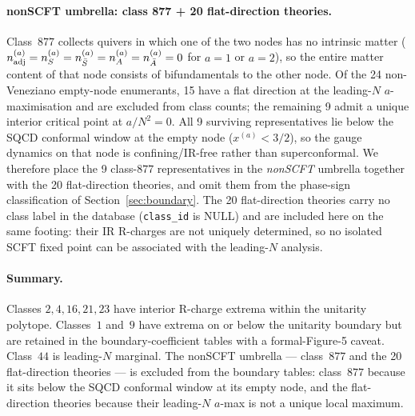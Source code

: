 \paragraph{nonSCFT umbrella: class 877 + 20 flat-direction theories.}
Class~$877$ collects quivers in which one of the two nodes has no
intrinsic matter ($n_{\mathrm{adj}}^{(a)}=n_{S}^{(a)}=n_{\bar S}^{(a)}=
n_{A}^{(a)}=n_{\bar A}^{(a)}=0$ for $a=1$ or $a=2$), so the entire
matter content of that node consists of bifundamentals to the other
node.  Of the 24 non-Veneziano empty-node enumerants, 15 have a flat
direction at the leading-$N$ $a$-maximisation and are excluded from
class counts; the remaining 9 admit a unique interior critical point
at $a/N^{2}=0$.  All 9 surviving representatives lie below the SQCD
conformal window at the empty node ($x^{(a)}<3/2$), so the gauge
dynamics on that node is confining/IR-free rather than
superconformal.  We therefore place the 9 class-$877$ representatives
in the \emph{nonSCFT} umbrella together with the 20 flat-direction
theories, and omit them from the phase-sign classification of
Section~\ref{sec:boundary}.  The 20 flat-direction theories carry no
class label in the database (\texttt{class\_id} is NULL) and are
included here on the same footing: their IR R-charges are not
uniquely determined, so no isolated SCFT fixed point can be
associated with the leading-$N$ analysis.

\paragraph{Summary.}
Classes $2,4,16,21,23$ have interior R-charge extrema within the
unitarity polytope.  Classes~$1$ and~$9$ have extrema on or below the
unitarity boundary but are retained in the boundary-coefficient
tables with a formal-Figure-5 caveat.  Class~$44$ is leading-$N$
marginal.  The nonSCFT umbrella — class~$877$ and the 20
flat-direction theories — is excluded from the boundary tables:
class~$877$ because it sits below the SQCD conformal window at its
empty node, and the flat-direction theories because their leading-$N$
$a$-max is not a unique local maximum.
